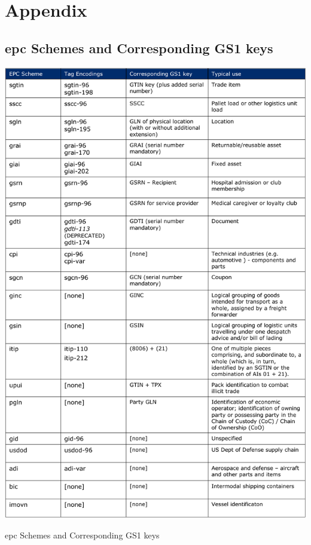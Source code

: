 \renewcommand{\thesection}{\Alph{section}}
\chapter{Appendix} 
\begin{appendices}
\section{\ac{epc} Schemes and Corresponding GS1 keys} \label{anx:epccodingschemes}
\begin{table}
    \centering
    \includegraphics[width=\textwidth]{./figs/02-state-of-the-art/epcschemes.pdf}
    \caption{\ac{epc} Schemes and Corresponding GS1 keys~\cite{GS1EPCTDS}} 
    \label{tab:epcschemes}
\end{table}
\end{appendices}